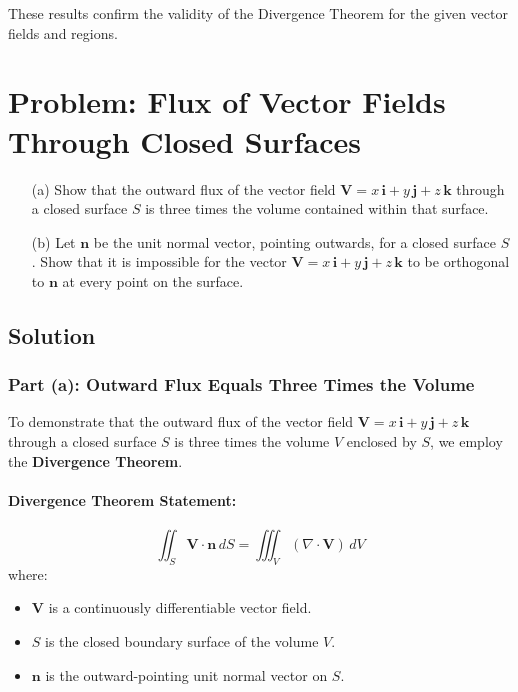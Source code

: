 \documentclass[11pt]{article}
\begin{document}
These results confirm the validity of the Divergence Theorem for the given vector fields and regions.




\newpage

\section{Problem: Flux of Vector Fields Through Closed Surfaces}

\begin{enumerate}
    \item[(a)] Show that the outward flux of the vector field \( \mathbf{V} = x\,\mathbf{i} + y\,\mathbf{j} + z\,\mathbf{k} \) through a closed surface \( S \) is three times the volume contained within that surface.

    \item[(b)] Let \( \mathbf{n} \) be the unit normal vector, pointing outwards, for a closed surface \( S \). Show that it is impossible for the vector \( \mathbf{V} = x\,\mathbf{i} + y\,\mathbf{j} + z\,\mathbf{k} \) to be orthogonal to \( \mathbf{n} \) at every point on the surface.
\end{enumerate}

\newpage

\subsection{Solution}

\subsubsection*{Part (a): Outward Flux Equals Three Times the Volume}

To demonstrate that the outward flux of the vector field \( \mathbf{V} = x\,\mathbf{i} + y\,\mathbf{j} + z\,\mathbf{k} \) through a closed surface \( S \) is three times the volume \( V \) enclosed by \( S \), we employ the \textbf{Divergence Theorem}.

\paragraph{Divergence Theorem Statement:}
\[
\iint_{S} \mathbf{V} \cdot \mathbf{n} \, dS = \iiint_{V} (\nabla \cdot \mathbf{V}) \, dV
\]
where:
\begin{itemize}
    \item \( \mathbf{V} \) is a continuously differentiable vector field.
    \item \( S \) is the closed boundary surface of the volume \( V \).
    \item \( \mathbf{n} \) is the outward-pointing unit normal vector on \( S \).
\end{itemize}
\end{document}

